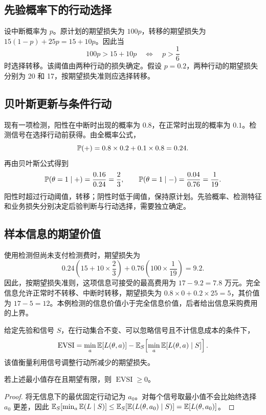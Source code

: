 \subsection{先验概率下的行动选择}
设中断概率为 \(p\)。原计划的期望损失为 \(100p\)，转移的期望损失为 \(15(1-p)+25p=15+10p\)。因此当
\[
100p>15+10p
\quad\Longleftrightarrow\quad p>\frac16
\]
时选择转移。该阈值由两种行动的损失确定。假设 \(p=0.2\)，两种行动的期望损失分别为 20 和 17，按期望损失准则应选择转移。

\subsection{贝叶斯更新与条件行动}
现有一项检测，阳性在中断时出现的概率为 \(0.8\)，在正常时出现的概率为 \(0.1\)。检测信号在选择行动前获得。由全概率公式，
\[
\mathbb P(+)=0.8\times0.2+0.1\times0.8=0.24.
\]
再由贝叶斯公式得到
\[
\mathbb P(\theta=1\mid+)=\frac{0.16}{0.24}=\frac23,\qquad
\mathbb P(\theta=1\mid-)=\frac{0.04}{0.76}=\frac1{19}.
\]
阳性时超过行动阈值，转移；阴性时低于阈值，保持原计划。先验概率、检测特征和业务损失分别决定后验判断与行动选择，需要独立确定。

\subsection{样本信息的期望价值}
使用检测但尚未支付检测费时，期望损失为
\[
0.24\left(15+10\times\frac23\right)
+0.76\left(100\times\frac1{19}\right)=9.2.
\]
因此，按期望损失准则，这项信息可接受的最高费用为 \(17-9.2=7.8\) 万元。完全信息允许正常时不转移、中断时转移，期望损失为 \(0.8\times0+0.2\times25=5\)，其价值为 \(17-5=12\)。本例检测的信息价值小于完全信息价值，后者给出信息采购费用的上界。

\begin{definition}[样本信息价值]
给定先验和信号 \(S\)，在行动集合不变、可以忽略信号且不计信息成本的条件下，
\[
\operatorname{EVSI}
=\min_a\mathbb E[L(\theta,a)]
-\mathbb E_S\!\left[\min_a\mathbb E[L(\theta,a)\mid S]\right].
\]
该值衡量利用信号调整行动所减少的期望损失。
\end{definition}

\begin{proposition}[样本信息价值的非负性]
若上述最小值存在且期望有限，则 \(\operatorname{EVSI}\ge0\)。
\end{proposition}
\begin{proof}
将无信息下的最优固定行动记为 \(a_0\)。对每个信号取最小值不会比始终选择 \(a_0\) 更差，因此
\(\mathbb E_S[\min_a\mathbb E(L\mid S)]\le\mathbb E_S[\mathbb E(L(\theta,a_0)\mid S)]=\mathbb E[L(\theta,a_0)]\)。
\end{proof}

